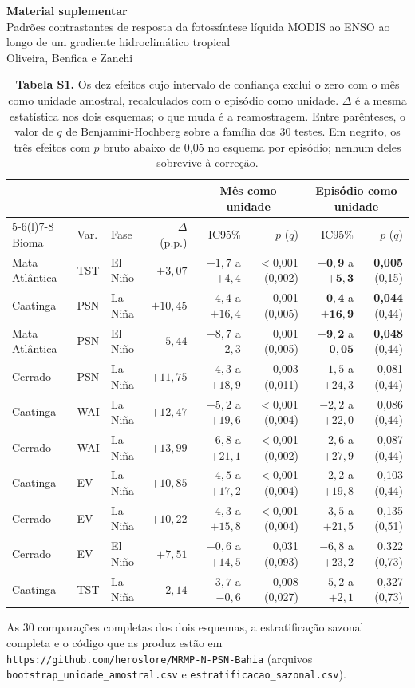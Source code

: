\documentclass[a4paper,11pt]{article}
\begin{document}
\pagestyle{empty}
\begin{center}
{\large\bfseries Material suplementar}\\[2pt]
Padrões contrastantes de resposta da fotossíntese líquida MODIS ao ENSO ao longo de um gradiente hidroclimático tropical\\[2pt]
Oliveira, Benfica e Zanchi
\end{center}
\vspace{1em}

\begin{table}[h]
\small
\caption{\textbf{Tabela S1.} Os dez efeitos cujo intervalo de confiança exclui o zero com o mês como unidade amostral, recalculados com o episódio como unidade. $\Delta$ é a mesma estatística nos dois esquemas; o que muda é a reamostragem. Entre parênteses, o valor de $q$ de Benjamini-Hochberg sobre a família dos 30 testes. Em negrito, os três efeitos com $p$ bruto abaixo de 0,05 no esquema por episódio; nenhum deles sobrevive à correção.}
\centering
\begin{tabular}{@{}lllrrrrr@{}}
\toprule
 & & & & \multicolumn{2}{c}{Mês como unidade} & \multicolumn{2}{c}{Episódio como unidade} \\
\cmidrule(lr){5-6}\cmidrule(l){7-8}
Bioma & Var. & Fase & $\Delta$ (p.p.) & IC95\% & $p$ ($q$) & IC95\% & $p$ ($q$) \\
\midrule
Mata Atlântica & TST & El Niño & $+3{,}07$  & $+1{,}7$ a $+4{,}4$  & $<$0,001 (0,002) & $\mathbf{+0{,}9}$ a $\mathbf{+5{,}3}$ & \textbf{0,005} (0,15) \\
Caatinga       & PSN & La Niña & $+10{,}45$ & $+4{,}4$ a $+16{,}4$ & 0,001 (0,005) & $\mathbf{+0{,}4}$ a $\mathbf{+16{,}9}$ & \textbf{0,044} (0,44) \\
Mata Atlântica & PSN & El Niño & $-5{,}44$  & $-8{,}7$ a $-2{,}3$  & 0,001 (0,005) & $\mathbf{-9{,}2}$ a $\mathbf{-0{,}05}$ & \textbf{0,048} (0,44) \\
\addlinespace
Cerrado        & PSN & La Niña & $+11{,}75$ & $+4{,}3$ a $+18{,}9$ & 0,003 (0,011) & $-1{,}5$ a $+24{,}3$ & 0,081 (0,44) \\
Caatinga       & WAI & La Niña & $+12{,}47$ & $+5{,}2$ a $+19{,}6$ & $<$0,001 (0,004) & $-2{,}2$ a $+22{,}0$ & 0,086 (0,44) \\
Cerrado        & WAI & La Niña & $+13{,}99$ & $+6{,}8$ a $+21{,}1$ & $<$0,001 (0,002) & $-2{,}6$ a $+27{,}9$ & 0,087 (0,44) \\
Caatinga       & EV  & La Niña & $+10{,}85$ & $+4{,}5$ a $+17{,}2$ & $<$0,001 (0,004) & $-2{,}2$ a $+19{,}8$ & 0,103 (0,44) \\
Cerrado        & EV  & La Niña & $+10{,}22$ & $+4{,}3$ a $+15{,}8$ & $<$0,001 (0,004) & $-3{,}5$ a $+21{,}5$ & 0,135 (0,51) \\
Cerrado        & EV  & El Niño & $+7{,}51$  & $+0{,}6$ a $+14{,}5$ & 0,031 (0,093) & $-6{,}8$ a $+23{,}2$ & 0,322 (0,73) \\
Caatinga       & TST & La Niña & $-2{,}14$  & $-3{,}7$ a $-0{,}6$  & 0,008 (0,027) & $-5{,}2$ a $+2{,}1$ & 0,327 (0,73) \\
\bottomrule
\end{tabular}
\end{table}

\vspace{1em}
\noindent\small As 30 comparações completas dos dois esquemas, a estratificação sazonal completa e o código que as produz estão em \texttt{https://github.com/heroslore/MRMP-N-PSN-Bahia} (arquivos \texttt{bootstrap\_unidade\_amostral.csv} e \texttt{estratificacao\_sazonal.csv}).
\end{document}
